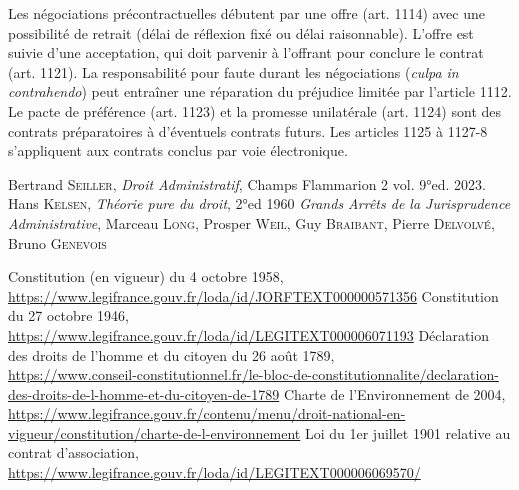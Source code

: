 \documentclass[math]{cours}
\begin{document}
Les négociations précontractuelles débutent par une offre (art. 1114) avec une possibilité de retrait (délai de réflexion fixé ou délai raisonnable). L'offre est suivie d'une acceptation, qui doit parvenir à l'offrant pour conclure le contrat (art. 1121). La responsabilité pour faute durant les négociations (\emph{culpa in contrahendo}) peut entraîner une réparation du préjudice limitée par l'article 1112.
Le pacte de préférence (art. 1123) et la promesse unilatérale (art. 1124) sont des contrats préparatoires à d'éventuels contrats futurs. Les articles 1125 à 1127-8 s'appliquent aux contrats conclus par voie électronique.

\begin{thebibliography}{255}
	Bertrand \textsc{Seiller}, \textit{Droit Administratif}, Champs Flammarion 2 vol. 9°ed. 2023.
	Hans \textsc{Kelsen}, \textit{Théorie pure du droit}, 2°ed 1960
	\textit{Grands Arrêts de la Jurisprudence Administrative}, Marceau \textsc{Long}, Prosper \textsc{Weil}, Guy \textsc{Braibant}, Pierre \textsc{Delvolvé}, Bruno \textsc{Genevois}



	Constitution (en vigueur) du 4 octobre 1958,\\
	\url{https://www.legifrance.gouv.fr/loda/id/JORFTEXT000000571356}
	Constitution du 27 octobre 1946,\\
	\url{https://www.legifrance.gouv.fr/loda/id/LEGITEXT000006071193}
	Déclaration des droits de l'homme et du citoyen du 26 août 1789,\\
	\url{https://www.conseil-constitutionnel.fr/le-bloc-de-constitutionnalite/declaration-des-droits-de-l-homme-et-du-citoyen-de-1789}
	Charte de l'Environnement de 2004,\\
	\url{https://www.legifrance.gouv.fr/contenu/menu/droit-national-en-vigueur/constitution/charte-de-l-environnement}
	Loi du 1er juillet 1901 relative au contrat d'association,\\
	\url{https://www.legifrance.gouv.fr/loda/id/LEGITEXT000006069570/}




\end{thebibliography}
\end{document}
